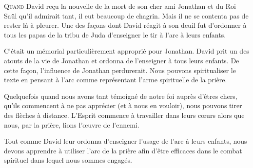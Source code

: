 



\lettrine{Q}{uand} David reçu la nouvelle de la mort
 de son cher ami Jonathan et du Roi Saül qu'il admirait tant,
 il eut beaucoup de chagrin. Mais il ne se contenta pas de rester
 là à pleurer.
 Une des façons dont David réagit à son deuil fut d'ordonner
 à tous les papas de la tribu de Juda d'enseigner le tir à l'arc
 à leurs enfants.

C'était un mémorial particulièrement approprié pour Jonathan.
 David prit un des atouts de la vie de Jonathan et ordonna
 de l'enseigner à tous leurs enfants. De cette façon,
 l'influence de Jonathan perdurerait.
 Nous pouvons spiritualiser le texte en pensant à l'arc
 comme représentant l'arme spirituelle de la prière.


Quelquefois quand nous avons tant témoigné de notre foi auprès d'êtres chers,
 qu'ils commencent à ne pas apprécier (et à nous en vouloir),
 nous pouvons tirer des flèches à distance.
 L'Esprit commence à travailler dans leurs cœurs alors que nous,
 par la prière, lions l'œuvre de l'ennemi.

Tout comme David leur ordonna d'enseigner l'usage de l'arc à leurs enfants,
 nous devons apprendre à utiliser l'arc de la prière afin d'être efficaces
 dans le combat spirituel dans lequel nous sommes engagés. 

\dvrule






